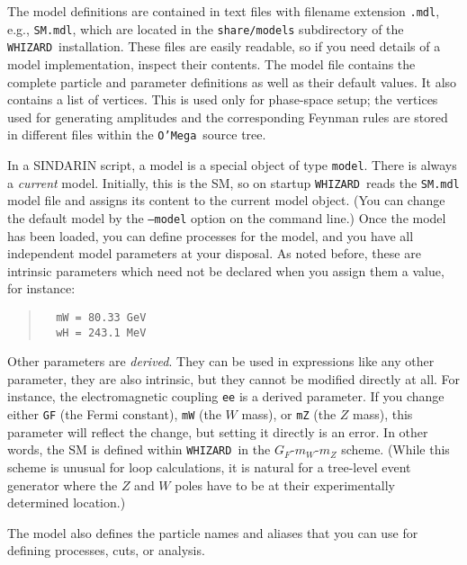 \documentclass[12pt]{book}
\newcommand{\ttt}[1]{\texttt{#1}}
\newcommand{\whizard}{\texttt{WHIZARD}}
\newcommand{\oMega}{\texttt{O'Mega}}
\begin{document}
The model definitions are contained in text files with filename extension
\ttt{.mdl}, e.g., \ttt{SM.mdl}, which are located in the \ttt{share/models}
subdirectory of the \whizard\ installation.  These files are easily readable,
so if you need details of a model implementation, inspect their contents.  The
model file contains the complete particle and parameter definitions as well as
their default values.  It also contains a list of vertices.  This is used only
for phase-space setup; the vertices used for generating amplitudes and the
corresponding Feynman rules are stored in different files within the
\oMega\ source tree.

In a SINDARIN script, a model is a special object of type \ttt{model}.  There
is always a \emph{current} model.  Initially, this is the SM, so on startup
\whizard\ reads the \ttt{SM.mdl} model file and assigns its content to the
current model object.  (You can change the default model by the \ttt{--model}
option on the command line.)  Once the model has been loaded, you can define
processes for the model, and you have all independent model parameters at your
disposal.  As noted before, these are intrinsic parameters which need not be
declared when you assign them a value, for instance:
\begin{quote}
\begin{footnotesize}
\begin{verbatim}
  mW = 80.33 GeV
  wH = 243.1 MeV  
\end{verbatim}
\end{footnotesize}
\end{quote}
Other parameters are \emph{derived}.  They can be used in expressions like any
other parameter, they are also intrinsic, but they cannot be modified directly
at all.  For instance, the electromagnetic coupling \ttt{ee} is a derived
parameter.  If you change either \ttt{GF} (the Fermi constant), \ttt{mW} (the
$W$ mass), or \ttt{mZ} (the $Z$ mass), this parameter will reflect the change,
but setting it directly is an error.  In other words, the SM is defined within
\whizard\ in the $G_F$-$m_W$-$m_Z$ scheme.  (While this scheme is unusual for
loop calculations, it is natural for a tree-level event generator where the
$Z$ and $W$ poles have to be at their experimentally determined location.)

The model also defines the particle names and aliases that you can use for
defining processes, cuts, or analysis.
\end{document}

